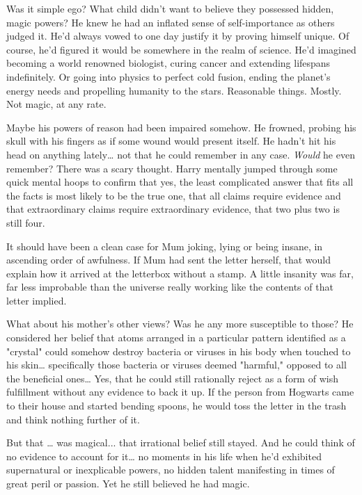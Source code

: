 Was it simple ego? What child didn't want to believe they
possessed hidden, magic powers? He knew he had an
inflated sense of self-importance as others judged it. He'd
always vowed to one day justify it by proving himself
unique. Of course, he'd figured it would be somewhere in
the realm of science. He'd imagined becoming a world
renowned biologist, curing cancer and extending lifespans
indefinitely. Or going into physics to perfect cold fusion,
ending the planet's energy needs and propelling humanity
to the stars. Reasonable things. Mostly. Not magic, at any
rate.

Maybe his powers of reason had been impaired somehow.
He frowned, probing his skull with his fingers as if some
wound would present itself. He hadn't hit his head on
anything lately{\ldots} not that he could remember in any case.
\emph{Would} he even remember? There was a scary thought.
Harry mentally jumped through some quick mental hoops
to confirm that yes, the least complicated answer that fits all
the facts is most likely to be the true one, that all claims
require evidence and that extraordinary claims require
extraordinary evidence, that two plus two is still four.

It should have been a clean case for Mum joking, lying or
being insane, in ascending order of awfulness. If Mum had
sent the letter herself, that would explain how it arrived at
the letterbox without a stamp. A little insanity was far, far
less improbable than the universe really working like the
contents of that letter implied.

What about his mother's other views? Was he any more
susceptible to those? He considered her belief that atoms
arranged in a particular pattern identified as a "crystal"
could somehow destroy bacteria or viruses in his body
when touched to his skin{\ldots} specifically those bacteria or
viruses deemed "harmful," opposed to all the beneficial
ones{\ldots} Yes, that he could still rationally reject as a form of
wish fulfillment without any evidence to back it up. If the
person from Hogwarts came to their house and started
bending spoons, he would toss the letter in the trash and
think nothing further of it.

But that {\ldots} was magical... that irrational belief still stayed.
And he could think of no evidence to account for it{\ldots} no
moments in his life when he'd exhibited supernatural or
inexplicable powers, no hidden talent manifesting in times
of great peril or passion. Yet he still believed he had magic.

